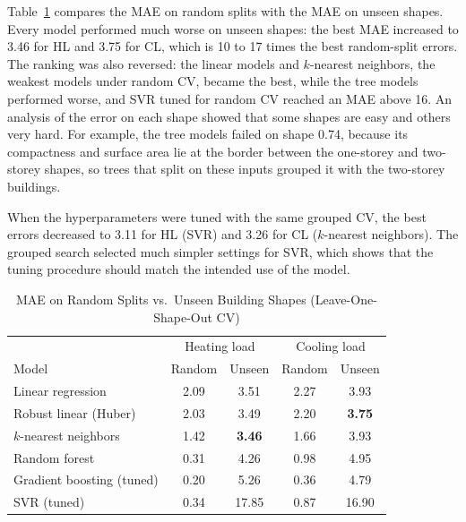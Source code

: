 \documentclass[journal]{IEEEtran}
\begin{document}
Table~\ref{tab:unseen} compares the MAE on random splits with the MAE on unseen shapes. Every model
performed much worse on unseen shapes: the best MAE increased to 3.46 for HL and 3.75 for CL, which is
10 to 17 times the best random-split errors. The ranking was also reversed: the linear models and
$k$-nearest neighbors, the weakest models under random CV, became the best, while the tree models
performed worse, and SVR tuned for random CV reached an MAE above 16. An analysis of the error on each shape
showed that some shapes are easy and others very hard. For example, the tree models failed on shape 0.74,
because its compactness and surface area lie at the border between the one-storey and two-storey shapes,
so trees that split on these inputs grouped it with the two-storey buildings.

When the hyperparameters were tuned with the same grouped CV, the best errors decreased to 3.11 for HL
(SVR) and 3.26 for CL ($k$-nearest neighbors). The grouped search selected much simpler settings for SVR,
which shows that the tuning procedure should match the intended use of the model.

\begin{table}[!tb]
\caption{MAE on Random Splits vs.\ Unseen Building Shapes (Leave-One-Shape-Out CV)}
\label{tab:unseen}
\centering
\begin{tabular}{@{}lcccc@{}}
\toprule
& \multicolumn{2}{c}{Heating load} & \multicolumn{2}{c}{Cooling load} \\
Model & Random & Unseen & Random & Unseen \\
\midrule
Linear regression          & 2.09 & 3.51 & 2.27 & 3.93 \\
Robust linear (Huber)      & 2.03 & 3.49 & 2.20 & \textbf{3.75} \\
$k$-nearest neighbors      & 1.42 & \textbf{3.46} & 1.66 & 3.93 \\
Random forest              & 0.31 & 4.26 & 0.98 & 4.95 \\
Gradient boosting (tuned)  & 0.20 & 5.26 & 0.36 & 4.79 \\
SVR (tuned)                & 0.34 & 17.85 & 0.87 & 16.90 \\
\bottomrule
\end{tabular}
\end{table}
\end{document}

